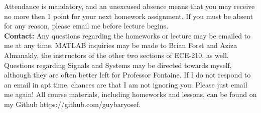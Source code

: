 \documentclass[12pt]{article}
\begin{document}
Attendance is mandatory, and an unexcused absence means that you may
receive no more then 1 point for your next homework assignment. 
If you must be absent for any reason, please email me before lecture begins. \\

\textbf{Contact:}
Any questions regarding the homeworks or lecture may be emailed 
to me at any time.
MATLAB inquiries may be made to Brian Forst and Aziza Almanakly, 
the instructors of the other two sections of ECE-210, as well. 
Questions regarding Signals and Systems may be directed towards myself, 
although they are often better left for Professor Fontaine. 
If I do not respond to an email in apt time, 
chances are that I am not ignoring you. 
Please just email me again!
All course materials, including homeworks and lessons,
can be found on my Github https://github.com/guybaryosef.
\end{document}
